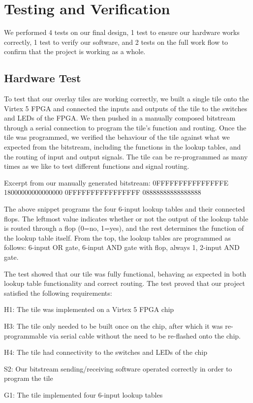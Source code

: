 \section{Testing and Verification}

We performed 4 tests on our final design, 1 test to ensure our hardware works correctly, 1 test to verify our software, and 2 tests on the full work flow to confirm that the project is working as a whole.

\subsection{Hardware Test}

To test that our overlay tiles are working correctly, we built a single tile onto the Virtex 5 FPGA and connected the inputs and outputs of the tile to the switches and LEDs of the FPGA.
We then pushed in a manually composed bitstream through a serial connection to program the tile's function and routing.
Once the tile was programmed, we verified the behaviour of the tile against what we expected from the bitstream, including the functions in the lookup tables, and the routing of input and output signals.
The tile can be re-programmed as many times as we like to test different functions and signal routing.

Excerpt from our manually generated bitstream:
0FFFFFFFFFFFFFFFE
18000000000000000
0FFFFFFFFFFFFFFFF
08888888888888888

The above snippet programs the four 6-input lookup tables and their connected flops.
The leftmost value indicates whether or not the output of the lookup table is routed through a flop (0=no, 1=yes), and the rest determines the function of the lookup table itself.
From the top, the lookup tables are programmed as follows: 6-input OR gate, 6-input AND gate with flop, always 1, 2-input AND gate.

The test showed that our tile was fully functional, behaving as expected in both lookup table functionality and correct routing.
The test proved that our project satisfied the following requirements:
\begin{itemlist}
	\item H1: The tile was implemented on a Virtex 5 FPGA chip
	\item H3: The tile only needed to be built once on the chip, after which it was re-programmable via serial cable without the need to be re-flashed onto the chip.
	\item H4: The tile had connectivity to the switches and LEDs of the chip
	\item S2: Our bitstream sending/receiving software operated correctly in order to program the tile
	\item G1: The tile implemented four 6-input lookup tables
\end{itemlist}

